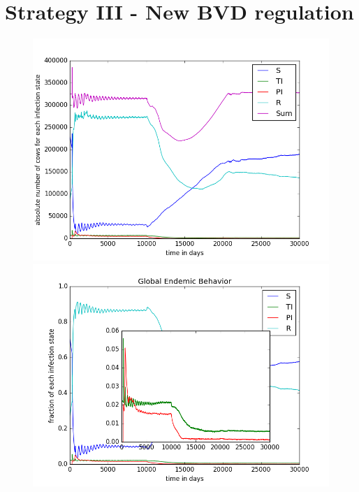 \section{Strategy III - New BVD regulation}

\begin{figure}[htbp]
\begin{minipage}{0.5\textwidth}
\centering
\noindent\includegraphics[width=0.95\linewidth,height=\textheight,
keepaspectratio]{cont3totalEndemicNumbers.png} 
\end{minipage}
\begin{minipage}{0.5\textwidth}
\centering
\noindent\includegraphics[width=0.95\linewidth,height=\textheight,
keepaspectratio]{cont3pendemicFractions.png} 
\end{minipage}
\caption[Endemic Behavior in Containment Strategy One]{}
\label{fig:demographyScen8}
\end{figure}


